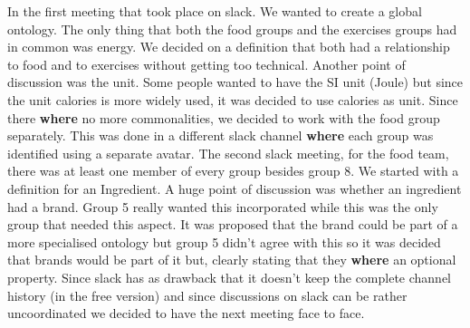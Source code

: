 In the first meeting that took place on slack. We wanted to create a global ontology. The only thing that both the food groups and the exercises groups had in common was energy. We decided on a definition that both had a relationship to food and to exercises without getting too technical. Another point of discussion was the unit. Some people wanted to have the SI unit (Joule) but since the unit calories is more widely used, it was decided to use calories as unit. Since there \textbf{where} no more commonalities, we decided to work with the food group separately. This was done in a different slack channel \textbf{where} each group was identified using a separate avatar. 
\newline
\newline
\noindent
The second slack meeting, for the food team, there was at least one member of every group besides group 8. We started with a definition for an Ingredient. A huge point of discussion was whether an ingredient had a brand. Group 5 really wanted this incorporated while this was the only group that needed this aspect. It was proposed that the brand could be part of a more specialised ontology but group 5 didn't agree with this so it was decided that brands would be part of it but, clearly stating that they \textbf{where} an optional property. Since slack has as drawback that it doesn't keep the complete channel history (in the free version) and since discussions on slack can be rather uncoordinated we decided to have the next meeting face to face. 
\newline
\newline
\noindent
